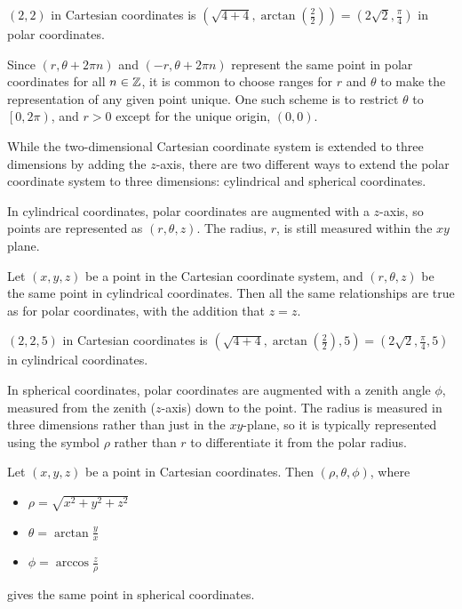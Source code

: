 \begin{exmp}
    $(2, 2)$ in Cartesian coordinates is $(\sqrt{4 + 4}, \arctan(\frac{2}{2})) = (2\sqrt{2}, \frac{\pi}{4})$ in polar coordinates.
\end{exmp}

Since $(r, \theta + 2\pi{n})$ and $(-r, \theta + 2\pi{n})$ represent the same point in polar coordinates for all $n \in \mathbb{Z}$, it is common to choose ranges for $r$ and $\theta$ to make the representation of any given point unique. One such scheme is to restrict $\theta$ to $\left[0, 2\pi\right)$, and $r > 0$ except for the unique origin, $(0, 0)$.

While the two-dimensional Cartesian coordinate system is extended to three dimensions by adding the $z$-axis, there are two different ways to extend the polar coordinate system to three dimensions: cylindrical and spherical coordinates.

In cylindrical coordinates, polar coordinates are augmented with a $z$-axis, so points are represented as $(r, \theta, z)$. The radius, $r$, is still measured within the $xy$ plane.

Let $(x, y, z)$ be a point in the Cartesian coordinate system, and $(r, \theta, z)$ be the same point in cylindrical coordinates. Then all the same relationships are true as for polar coordinates, with the addition that $z = z$.

\begin{exmp}
    $(2, 2, 5)$ in Cartesian coordinates is $(\sqrt{4 + 4}, \arctan(\frac{2}{2}), 5) = (2\sqrt{2}, \frac{\pi}{4}, 5)$ in cylindrical coordinates.
\end{exmp}

In spherical coordinates, polar coordinates are augmented with a zenith angle $\phi$, measured from the zenith ($z$-axis) down to the point. The radius is measured in three dimensions rather than just in the $xy$-plane, so it is typically represented using the symbol $\rho$ rather than $r$ to differentiate it from the polar radius.

\begin{thm}
    Let $(x, y, z)$ be a point in Cartesian coordinates. Then $(\rho, \theta, \phi)$, where
    \begin{itemize}
        \item $\rho = \sqrt{x^2 + y^2 + z^2}$
        \item $\theta = \arctan\frac{y}{x}$
        \item $\phi = \arccos\frac{z}{\rho}$
    \end{itemize} gives the same point in spherical coordinates.
\end{thm}

